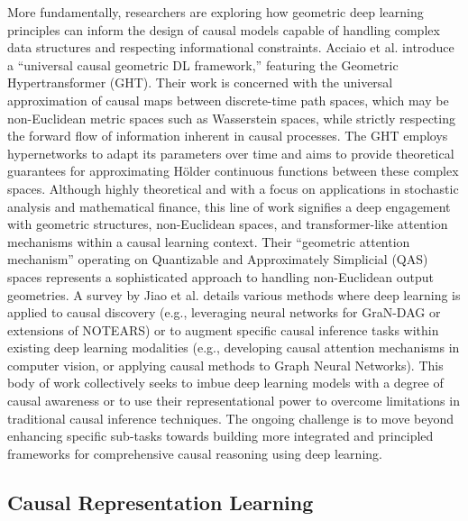 {More fundamentally, researchers are exploring how geometric deep learning principles can inform the design of causal models capable of handling complex data structures and respecting informational constraints. Acciaio et al. \cite{acciaio2024designing} introduce a ``universal causal geometric DL framework,'' featuring the Geometric Hypertransformer (GHT). Their work is concerned with the universal approximation of causal maps between discrete-time path spaces, which may be non-Euclidean metric spaces such as Wasserstein spaces, while strictly respecting the forward flow of information inherent in causal processes. The GHT employs hypernetworks to adapt its parameters over time and aims to provide theoretical guarantees for approximating Hölder continuous functions between these complex spaces. Although highly theoretical and with a focus on applications in stochastic analysis and mathematical finance, this line of work signifies a deep engagement with geometric structures, non-Euclidean spaces, and transformer-like attention mechanisms within a causal learning context. Their ``geometric attention mechanism'' operating on Quantizable and Approximately Simplicial (QAS) spaces represents a sophisticated approach to handling non-Euclidean output geometries. A survey by Jiao et al. \cite{jiao2024causal} details various methods where deep learning is applied to causal discovery (e.g., leveraging neural networks for GraN-DAG or extensions of NOTEARS) or to augment specific causal inference tasks within existing deep learning modalities (e.g., developing causal attention mechanisms in computer vision, or applying causal methods to Graph Neural Networks). This body of work collectively seeks to imbue deep learning models with a degree of causal awareness or to use their representational power to overcome limitations in traditional causal inference techniques. The ongoing challenge is to move beyond enhancing specific sub-tasks towards building more integrated and principled frameworks for comprehensive causal reasoning using deep learning.

\subsection{Causal Representation Learning}

}
